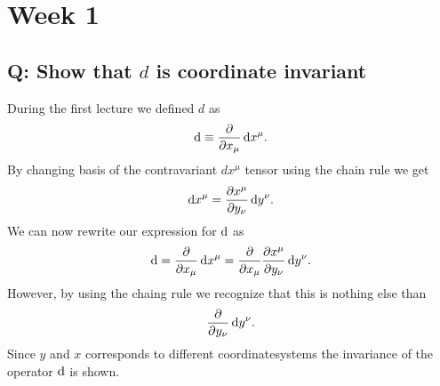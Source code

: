 \section{Week 1}
\subsection{Q: Show that $d$ is coordinate invariant}
During the first lecture we defined $d$ as
\begin{equation}
\mathrm{d} \equiv \frac{\partial}{\partial x_{\mu}} \,\mathrm{d} x^{\mu}.
\end{equation}
By changing basis of the contravariant $dx^{\mu}$ tensor using the chain rule we get
\begin{equation}
\mathrm{d} x^{\mu} = \frac{\partial x^{\mu}}{\partial y_{\nu}} \,\mathrm{d} y^{\nu}.
\end{equation}
We can now rewrite our expression for $\mathrm{d}$ as
\begin{equation}
\mathrm{d} = \frac{\partial}{\partial x_{\mu}} \,\mathrm{d} x^{\mu} =\frac{\partial}{\partial x_{\mu}} \frac{\partial x^{\mu}}{\partial y_{\nu}} \,\mathrm{d} y^{\nu}.
\end{equation}
However, by using the chaing rule we recognize that this is nothing else than
\begin{equation}
\frac{\partial}{\partial y_{\nu}} \,\mathrm{d} y^{\nu}.
\end{equation}
Since $y$ and $x$ corresponds to different coordinatesystems the invariance of the operator $\mathrm{d}$ is shown.
\cite{tidigarekandidat}